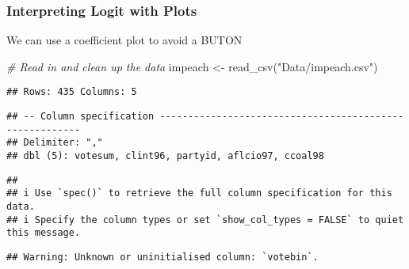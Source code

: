 \documentclass[
]{article}
\newenvironment{Shaded}{\begin{snugshade}}{\end{snugshade}}
\newcommand{\CommentTok}[1]{\textcolor[rgb]{0.56,0.35,0.01}{\textit{#1}}}
\newcommand{\DecValTok}[1]{\textcolor[rgb]{0.00,0.00,0.81}{#1}}
\newcommand{\FunctionTok}[1]{\textcolor[rgb]{0.00,0.00,0.00}{#1}}
\newcommand{\NormalTok}[1]{#1}
\newcommand{\OtherTok}[1]{\textcolor[rgb]{0.56,0.35,0.01}{#1}}
\newcommand{\SpecialCharTok}[1]{\textcolor[rgb]{0.00,0.00,0.00}{#1}}
\newcommand{\StringTok}[1]{\textcolor[rgb]{0.31,0.60,0.02}{#1}}
\begin{document}
\hypertarget{interpreting-logit-with-plots}{%
\subsubsection{Interpreting Logit with
Plots}\label{interpreting-logit-with-plots}}

We can use a coefficient plot to avoid a BUTON

\begin{Shaded}
\begin{Highlighting}[]
\CommentTok{\# Read in and clean up the data}
\NormalTok{impeach }\OtherTok{\textless{}{-}} \FunctionTok{read\_csv}\NormalTok{(}\StringTok{"Data/impeach.csv"}\NormalTok{)}
\end{Highlighting}
\end{Shaded}

\begin{verbatim}
## Rows: 435 Columns: 5
\end{verbatim}

\begin{verbatim}
## -- Column specification --------------------------------------------------------
## Delimiter: ","
## dbl (5): votesum, clint96, partyid, aflcio97, ccoal98
\end{verbatim}

\begin{verbatim}
## 
## i Use `spec()` to retrieve the full column specification for this data.
## i Specify the column types or set `show_col_types = FALSE` to quiet this message.
\end{verbatim}

\begin{Shaded}
\end{Shaded}

\begin{verbatim}
## Warning: Unknown or uninitialised column: `votebin`.
\end{verbatim}
\end{document}
